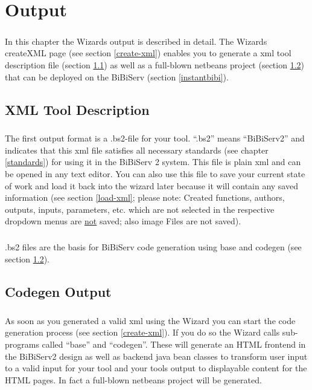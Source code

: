 \documentclass[a4paper,10pt]{book}
\begin{document}
\chapter{Output}
\label{output}
\paragraph{} In this chapter the Wizards output is described in detail. The Wizards createXML page (see section \ref{create-xml}) enables you to generate a xml tool description file (section \ref{bs2}) as well as a full-blown netbeans project (section \ref{codegen}) that can be deployed on the BiBiServ (section \ref{instantbibi}).

\section{XML Tool Description}
\label{bs2}
\paragraph{} The first output format is a .bs2-file for your tool. ``.bs2'' means ``BiBiServ2'' and indicates that this xml file satisfies all necessary standards (see chapter \ref{standards}) for using it in the BiBiServ 2 system.
This file is plain xml and can be opened in any text editor. You can also use this file to save your current state of work and load it back into the wizard later because it will contain any saved information (see section \ref{load-xml}; please note: Created functions, authors, outputs, inputs, parameters, etc. which are not selected in the respective dropdown menus are \underline{not} saved; also image Files are not saved).
\paragraph{} .bs2 files are the basis for BiBiServ code generation using base and codegen (see section \ref{codegen}).

\section{Codegen Output}
\label{codegen}
\paragraph{} As soon as you generated a valid xml using the Wizard you can start the code generation process (see section \ref{create-xml}). If you do so the Wizard calls sub-programs called ``base'' and ``codegen''. These will generate an HTML frontend in the BiBiServ2 design as well as backend java bean classes to transform user input to a valid input for your tool and your tools output to displayable content for the HTML pages. In fact a full-blown netbeans project will be generated.
\end{document}
